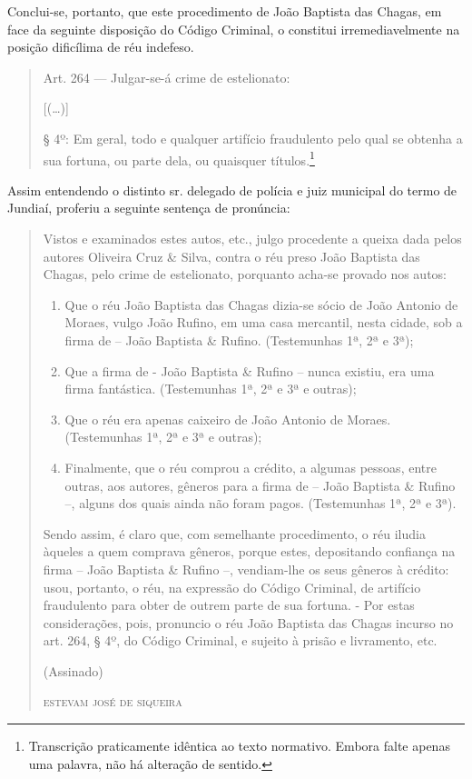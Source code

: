 Conclui-se, portanto, que este procedimento de João Baptista das Chagas,
em face da seguinte disposição do Código Criminal, o constitui
irremediavelmente na posição dificílima de réu indefeso.

\begin{quote}
Art. 264 --- Julgar-se-á crime de estelionato:

{[}(\ldots{}){]}

§ 4º: Em geral, todo e qualquer artifício fraudulento pelo qual se
obtenha a sua fortuna, ou parte dela, ou quaisquer títulos.\footnote{Transcrição
  praticamente idêntica ao texto normativo. Embora falte apenas uma
  palavra, não há alteração de sentido.}
\end{quote}

Assim entendendo o distinto sr. delegado de polícia e juiz municipal do
termo de Jundiaí, proferiu a seguinte sentença de pronúncia:

\begin{quote}
Vistos e examinados estes autos, etc., julgo procedente a queixa dada
pelos autores Oliveira Cruz \& Silva, contra o réu preso João Baptista
das Chagas, pelo crime de estelionato, porquanto acha-se provado nos
autos:

\begin{enumerate}[label=\arabic*º]
\item Que o réu João Baptista das Chagas dizia-se sócio de João Antonio de
Moraes, vulgo João Rufino, em uma casa mercantil, nesta cidade, sob a
firma de -- João Baptista \& Rufino. (Testemunhas 1ª, 2ª e 3ª);

\item Que a firma de - João Baptista \& Rufino -- nunca existiu, era uma
firma fantástica. (Testemunhas 1ª, 2ª e 3ª e outras);

\item Que o réu era apenas caixeiro de João Antonio de Moraes.
(Testemunhas 1ª, 2ª e 3ª e outras);

\item Finalmente, que o réu comprou a crédito, a algumas pessoas, entre
outras, aos autores, gêneros para a firma de -- João Baptista \& Rufino
--, alguns dos quais ainda não foram pagos. (Testemunhas 1ª, 2ª e 3ª).
\end{enumerate}

Sendo assim, é claro que, com semelhante procedimento, o réu iludia
àqueles a quem comprava gêneros, porque estes, depositando confiança na
firma -- João Baptista \& Rufino --, vendiam-lhe os seus gêneros à
crédito: usou, portanto, o réu, na expressão do Código Criminal, de
artifício fraudulento para obter de outrem parte de sua fortuna. - Por
estas considerações, pois, pronuncio o réu João Baptista das Chagas
incurso no art. 264, § 4º, do Código Criminal, e sujeito à prisão e
livramento, etc.

\begin{flushright}
(Assinado)

\textsc{estevam josé de siqueira}
\end{flushright}
\end{quote}

